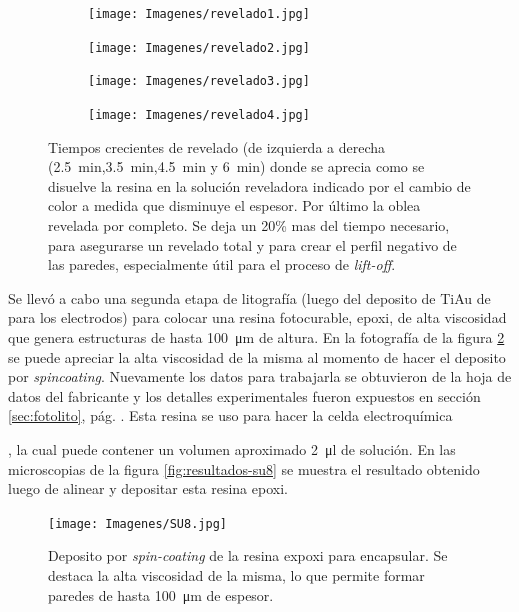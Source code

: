 { 				%
 				\begin{figure}[th]
			 	   	    \centering
			 	   	    \begin{subfigure}[t]{0.235\textwidth}
			        	\texttt{[image: Imagenes/revelado1.jpg]}
			       		\end{subfigure}
			     		\begin{subfigure}[t]{0.235\textwidth}
			     		\texttt{[image: Imagenes/revelado2.jpg]}
			    		\end{subfigure}
			     		\begin{subfigure}[t]{0.235\textwidth}
			         	\texttt{[image: Imagenes/revelado3.jpg]}
			        	\end{subfigure}
						\begin{subfigure}[t]{0.235\textwidth}
			     		\texttt{[image: Imagenes/revelado4.jpg]}
			        	\end{subfigure}
			     		\caption[Revelado en función del tiempo]{Tiempos crecientes de revelado (de izquierda  a derecha (\SI{2.5}{min},\SI{3.5}{min},\SI{4.5}{min} y \SI{6}{min}) donde se aprecia como se disuelve la resina en la solución reveladora indicado por el cambio de color a medida que disminuye el espesor. Por último la oblea revelada por completo. Se deja un 20\% mas del tiempo necesario, para asegurarse un revelado total y para crear el perfil negativo de las paredes, especialmente útil para el proceso de\textit{ lift-off}.}
			     		\label{fig:revelado}
			     	   	\end{figure}

 		     Se llevó a cabo una segunda etapa de litografía (luego del deposito de Ti\textbar Au de para los electrodos) para colocar una resina fotocurable, epoxi, de alta viscosidad que genera estructuras de hasta \SI{100}{\um} de altura. En la fotografía de la figura \ref{fig:su8} se puede apreciar la alta viscosidad de la misma al momento de hacer el deposito por \textit{spincoating}. Nuevamente los datos para trabajarla se obtuvieron de la hoja de datos del fabricante\cite{Su8,Microchemicals2014} y los detalles experimentales fueron expuestos en  sección \ref{sec:fotolito}, pág. \pageref{sec:fotolito}. Esta resina se uso para hacer la celda electroquímica}, la cual puede contener un volumen aproximado \SI{2}{\ul} de solución. En las microscopias de la figura \ref{fig:resultados-su8} se muestra el resultado obtenido luego de alinear y depositar esta resina epoxi.

 				\begin{figure}[ht!]
 				\centering
 				\texttt{[image: Imagenes/SU8.jpg]}
 				\caption[Depósito de la resina epoxi SU8]{Deposito por \textit{spin-coating }de la resina expoxi para encapsular. Se destaca la alta viscosidad de la misma, lo que permite formar paredes de hasta \SI{100}{\um} de espesor.}
 				\label{fig:su8}
 				\end{figure}

